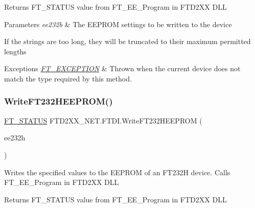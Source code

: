 \begin{DoxyReturn}{Returns}
F\+T\+\_\+\+S\+T\+A\+T\+US value from F\+T\+\_\+\+E\+E\+\_\+\+Program in F\+T\+D2\+XX D\+LL
\end{DoxyReturn}

\begin{DoxyParams}{Parameters}
{\em ee232b} & The E\+E\+P\+R\+OM settings to be written to the device\\
\hline
\end{DoxyParams}


If the strings are too long, they will be truncated to their maximum permitted lengths


\begin{DoxyExceptions}{Exceptions}
{\em \mbox{\hyperlink{class_f_t_d2_x_x___n_e_t_1_1_f_t_d_i_1_1_f_t___e_x_c_e_p_t_i_o_n}{F\+T\+\_\+\+E\+X\+C\+E\+P\+T\+I\+ON}}} & Thrown when the current device does not match the type required by this method.\\
\hline
\end{DoxyExceptions}
\mbox{\label{class_f_t_d2_x_x___n_e_t_1_1_f_t_d_i_a6768adf2b22ff1e7df030e7a7a69f8d6}} 
\subsubsection{\texorpdfstring{WriteFT232HEEPROM()}{WriteFT232HEEPROM()}}
{\footnotesize\ttfamily \mbox{\hyperlink{class_f_t_d2_x_x___n_e_t_1_1_f_t_d_i_aabe20ad905cc4ccc1e35dd5b877d9a83}{F\+T\+\_\+\+S\+T\+A\+T\+US}} F\+T\+D2\+X\+X\+\_\+\+N\+E\+T.\+F\+T\+D\+I.\+Write\+F\+T232\+H\+E\+E\+P\+R\+OM (\begin{DoxyParamCaption}\item[{\mbox{\hyperlink{class_f_t_d2_x_x___n_e_t_1_1_f_t_d_i_1_1_f_t232_h___e_e_p_r_o_m___s_t_r_u_c_t_u_r_e}{F\+T232\+H\+\_\+\+E\+E\+P\+R\+O\+M\+\_\+\+S\+T\+R\+U\+C\+T\+U\+RE}}}]{ee232h }\end{DoxyParamCaption})}



Writes the specified values to the E\+E\+P\+R\+OM of an F\+T232H device. Calls F\+T\+\_\+\+E\+E\+\_\+\+Program in F\+T\+D2\+XX D\+LL 

\begin{DoxyReturn}{Returns}
F\+T\+\_\+\+S\+T\+A\+T\+US value from F\+T\+\_\+\+E\+E\+\_\+\+Program in F\+T\+D2\+XX D\+LL
\end{DoxyReturn}

